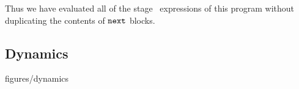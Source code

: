 Thus we have evaluated all of the stage \bbone\ expressions of this program without duplicating the contents of ${\tt next}$ blocks.

\subsection{Dynamics}

 {figures/dynamics}


